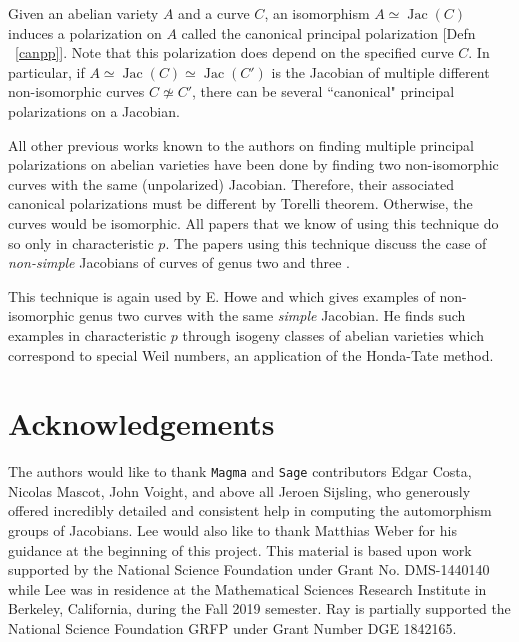 \documentclass[12pt,reqno]{amsart}
\DeclareMathOperator{\Jac}{Jac}
\theoremstyle{definition}
\theoremstyle{remark}
\begin{document}
Given an abelian variety $A$ and a curve $C$, an isomorphism $A \simeq \Jac(C)$ induces a polarization on $A$ called the canonical principal polarization [Defn ~\ref{canpp}]. Note that this polarization does depend on the specified curve $C$. In particular, if $A \simeq \Jac(C) \simeq \Jac(C')$ is the Jacobian of multiple different non-isomorphic curves $C \not\simeq C'$, there can be several ``canonical" principal polarizations on a Jacobian.


All other previous works known to the authors on finding multiple principal polarizations on abelian varieties have been done by finding two non-isomorphic curves with the same (unpolarized) Jacobian. Therefore, their associated canonical polarizations must be different by Torelli theorem. Otherwise, the curves would be isomorphic. All papers that we know of using this technique do so only in characteristic $p$. The papers using this technique discuss the case of \textit{non-simple} Jacobians of curves of genus two \cite{iko} and three \cite{brock}.

This technique is again used by E. Howe \cite{howe1} and \cite{howe2} which gives examples of non-isomorphic genus two curves with the same \textit{simple} Jacobian. He finds such examples in characteristic $p$ through isogeny classes of abelian varieties which correspond to special Weil numbers, an application of the Honda-Tate method. 

\section*{Acknowledgements} 
The authors would like to thank \texttt{Magma} and \texttt{Sage} contributors Edgar Costa, Nicolas Mascot, John Voight, and above all Jeroen Sijsling, who generously offered incredibly detailed and consistent help in computing the automorphism groups of Jacobians. Lee would also like to thank Matthias Weber for his guidance at the beginning of this project. This material is based upon work supported by the National Science Foundation under Grant No. DMS-1440140 while Lee was in residence at the Mathematical Sciences Research Institute in Berkeley, California, during the Fall 2019 semester. Ray is partially supported the National Science Foundation GRFP under Grant Number DGE 1842165.
\end{document}
